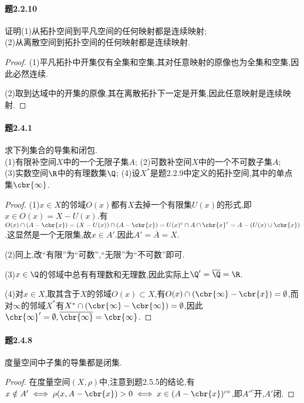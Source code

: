 \documentclass{article}
\begin{document}
\paragraph{题2.2.10}证明(1)从拓扑空间到平凡空间的任何映射都是连续映射;\\
(2)从离散空间到拓扑空间的任何映射都是连续映射.
\begin{proof}
    (1)平凡拓扑中开集仅有全集和空集,其对任意映射的原像也为全集和空集,因此必然连续.

    (2)取到达域中的开集的原像,其在离散拓扑下一定是开集,因此任意映射是连续映射.
\end{proof}


\paragraph{题2.4.1}求下列集合的导集和闭包.\\
(1)有限补空间$X$中的一个无限子集$A$;
(2)可数补空间$X$中的一个不可数子集$A$;\\
(3)实数空间$\R$中的有理数集$\Q$;
(4)设$X^*$是题2.2.9中定义的拓扑空间,其中的单点集$\cbr{\infty}$.

\begin{proof}
    (1)$x\in X$的邻域$O(x)$都有$X$去掉一个有限集$U(x)$的形式,即$x\in O(x)=X-U(x)$.有$O(x)\cap (A-\cbr{x})=(X-U(x))\cap (A-\cbr{x})=U(x)^c\cap A\cap \cbr{x}^c=A-(U(x)\cup\cbr{x})$.这显然是一个无限集,故$x\in A'$.因此$A'=\overline{A}=X$.

    (2)同上,改``有限''为``可数'',``无限''为``不可数''即可.

    (3)$x\in \Q$的邻域中总有有理数和无理数,因此实际上$\Q'=\overline{\Q}=\R$.

    (4)对$x\in X$,取其含于$X$的邻域$O(x)\subset X$,有$O(x)\cap(\cbr{\infty}-\cbr{x})=\emptyset$,而对$\infty$的邻域$X^*$有$X^*\cap(\cbr{\infty}-\cbr{\infty})=\emptyset$,因此$\cbr{\infty}'=\emptyset,\overline{\cbr{\infty}}=\cbr{\infty}$.
\end{proof}

\paragraph{题2.4.8}度量空间中子集的导集都是闭集.
\begin{proof}
    在度量空间$(X,\rho)$中,注意到题2.5.5的结论,有$x\notin A'\iff \rho(x,A-\cbr{x})>0\iff x\in (A-\cbr{x})^{c\circ}$,即$A'^c$开,$A'$闭.
\end{proof}
\end{document}
